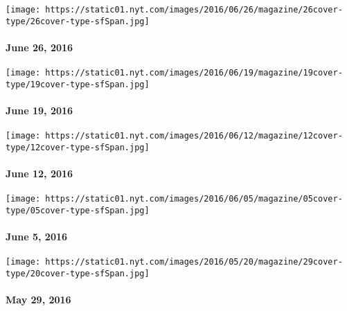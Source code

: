 \href{http://www.nytimes.com/indexes/2016/06/26/magazine/index.html}{}

\texttt{[image: https://static01.nyt.com/images/2016/06/26/magazine/26cover-type/26cover-type-sfSpan.jpg]}

\hypertarget{june-26-2016}{%
\paragraph{June 26, 2016}\label{june-26-2016}}

\href{http://www.nytimes.com/indexes/2016/06/19/magazine/index.html}{}

\texttt{[image: https://static01.nyt.com/images/2016/06/19/magazine/19cover-type/19cover-type-sfSpan.jpg]}

\hypertarget{june-19-2016}{%
\paragraph{June 19, 2016}\label{june-19-2016}}

\href{http://www.nytimes.com/indexes/2016/06/12/magazine/index.html}{}

\texttt{[image: https://static01.nyt.com/images/2016/06/12/magazine/12cover-type/12cover-type-sfSpan.jpg]}

\hypertarget{june-12-2016}{%
\paragraph{June 12, 2016}\label{june-12-2016}}

\href{http://www.nytimes.com/indexes/2016/06/05/magazine/index.html}{}

\texttt{[image: https://static01.nyt.com/images/2016/06/05/magazine/05cover-type/05cover-type-sfSpan.jpg]}

\hypertarget{june-5-2016}{%
\paragraph{June 5, 2016}\label{june-5-2016}}

\href{http://www.nytimes.com/indexes/2016/05/29/magazine/index.html}{}

\texttt{[image: https://static01.nyt.com/images/2016/05/20/magazine/29cover-type/20cover-type-sfSpan.jpg]}

\hypertarget{may-29-2016}{%
\paragraph{May 29, 2016}\label{may-29-2016}}

